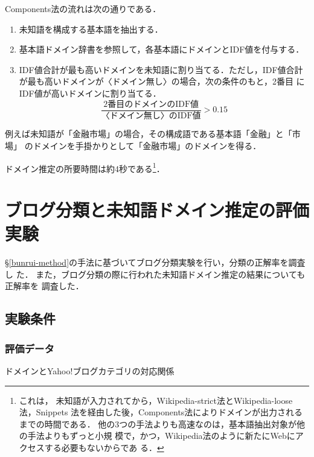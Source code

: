 \documentclass[japanese]{jnlp_1.4}
\begin{document}
Components法の流れは次の通りである．

\begin{enumerate}
 \item 未知語を構成する基本語を抽出する．
 \item 基本語ドメイン辞書を参照して，各基本語にドメインとIDF値を付与する．
 \item IDF値合計が最も高いドメインを未知語に割り当てる．ただし，IDF値合計
       が最も高いドメインが〈ドメイン無し〉の場合，次の条件のもと，2番目
       にIDF値が高いドメインに割り当てる．
       $$\frac{\textrm{2番目のドメインのIDF値}}{\textrm{〈ドメイン無し〉のIDF値}}>0.15$$
\end{enumerate}

例えば未知語が「金融市場」の場合，その構成語である基本語「金融」と「市場」
のドメインを手掛かりとして「金融市場」のドメインを得る．

ドメイン推定の所要時間は約4秒である\footnote{
これは，
未知語が入力されてから，Wikipedia-strict法とWikipedia-loose法，Snippets
法を経由した後，Components法によりドメインが出力されるまでの時間である．
他の3つの手法よりも高速なのは，基本語抽出対象が他の手法よりもずっと小規
模で，かつ，Wikipedia法のように新たにWebにアクセスする必要もないからであ
る．
}．


\section{ブログ分類と未知語ドメイン推定の評価実験 \label{eval}}

\S\ref{bunrui-method}の手法に基づいてブログ分類実験を行い，分類の正解率を調査し
た．
また，ブログ分類の際に行われた未知語ドメイン推定の結果についても正解率を
調査した．


\subsection{実験条件}

\subsubsection{評価データ}

\begin{table}[b]
\caption{ドメインとYahoo!ブログカテゴリの対応関係}
\label{domain-yahoo}
\begin{center}

\end{center}
\end{table}
\end{document}
